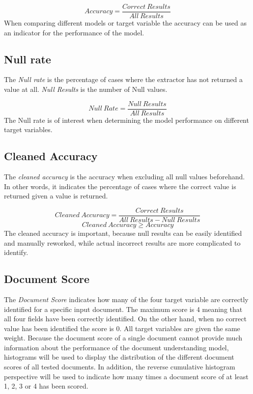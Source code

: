 \[ Accuracy = \frac{Correct \ Results}{All \ Results}\]
When comparing different models or target variable the accuracy can be used as an indicator for the performance of the model.
\subsection{Null rate}
The \textit{Null rate} is the percentage of cases where the extractor has not returned a value at all. \textit{Null Results} is the number of Null values.

\[ Null \ Rate = \frac{Null \ Results}{All \ Results}\]
The Null rate is of interest when determining the model performance on different target variables.
\subsection{Cleaned Accuracy}
The \textit{cleaned accuracy} is the accuracy when excluding all null values beforehand. In other words, it indicates the percentage of cases where the correct value is returned given a value is returned.

\[ Cleaned \ Accuracy = \frac{Correct \ Results}{All \ Results - Null \ Results}\] 
\[Cleaned \ Accuracy \geq Accuracy\]
The cleaned accuracy is important, because null results can be easily identified and manually reworked, while actual incorrect results are more complicated to identify.
\subsection{Document Score}
The \textit{Document Score} indicates how many of the four target variable are correctly identified for a specific input document.
The maximum score is 4 meaning that all four fields have been correctly identified. On the other hand, when no correct value has been identified
the score is 0. All target variables are given the same weight.
Because the document score of a single document cannot provide much information about the performance of the document understanding model, histograms will be used to display the distribution of the different document scores of all tested documents. In addition, the reverse cumulative histogram perspective will be used to indicate how many times a document score of at least 1, 2, 3 or 4 has been scored.